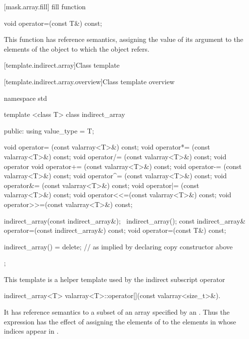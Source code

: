 [mask.array.fill]{ fill function}

%
\begin{itemdecl}
void operator=(const T&) const;
\end{itemdecl}

\begin{itemdescr}
\pnum
This function has reference semantics, assigning the value of its
argument to the elements of the
object to which the
object refers.
\end{itemdescr}

[template.indirect.array]{Class template }

[template.indirect.array.overview]{Class template  overview}

%
\begin{codeblock}
namespace std {
  template <class T> class indirect_array {
  public:
    using value_type = T;

    void operator=  (const valarray<T>&) const;
    void operator*= (const valarray<T>&) const;
    void operator/= (const valarray<T>&) const;
    void operator%
    void operator+= (const valarray<T>&) const;
    void operator-= (const valarray<T>&) const;
    void operator^= (const valarray<T>&) const;
    void operator&= (const valarray<T>&) const;
    void operator|= (const valarray<T>&) const;
    void operator<<=(const valarray<T>&) const;
    void operator>>=(const valarray<T>&) const;

    indirect_array(const indirect_array&);
    ~indirect_array();
    const indirect_array& operator=(const indirect_array&) const;
    void operator=(const T&) const;

    indirect_array() = delete;        // as implied by declaring copy constructor above
  };
}
\end{codeblock}

\pnum
This template is a helper template used by the indirect subscript operator

%
\begin{itemdecl}
indirect_array<T> valarray<T>::operator[](const valarray<size_t>&).
\end{itemdecl}

\begin{itemdescr}
\pnum
It has reference semantics to a subset of an array specified by an
.
Thus the expression
has the effect of assigning the elements of
to the elements in
whose indices appear in
.
\end{itemdescr}

